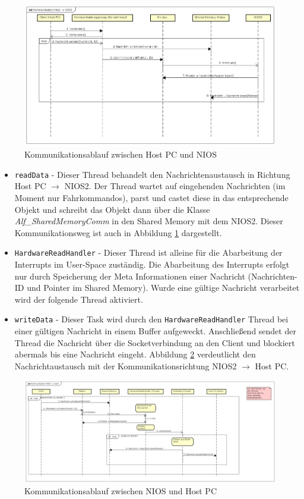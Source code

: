 \begin{figure}
	\includegraphics[width=\textwidth]{Abb/Komm_Host_NIOS.png}
	\caption{Kommunikationsablauf zwischen Host PC und NIOS}
	\label{SW:Komm:HOSTNIOS}
\end{figure}

\begin{itemize}
	\item \lstinline|readData| - Dieser Thread behandelt den Nachrichtenaustausch in Richtung Host PC $\rightarrow$ NIOS2. Der Thread wartet auf eingehenden Nachrichten (im Moment nur Fahrkommandos), parst und castet diese in das entsprechende Objekt und schreibt das Objekt dann über die Klasse \textit{Alf\_SharedMemoryComm} in den Shared Memory mit dem NIOS2. Dieser Kommunikationsweg ist auch in Abbildung \ref{SW:Komm:HOSTNIOS} dargestellt.
	\item \lstinline|HardwareReadHandler| - Dieser Thread ist alleine für die Abarbeitung der Interrupts im User-Space zuständig. Die Abarbeitung des Interrupts erfolgt nur durch Speicherung der Meta Informationen einer Nachricht (Nachrichten-ID und Pointer im Shared Memory). Wurde eine gültige Nachricht verarbeitet wird der folgende Thread aktiviert.
	\item \lstinline|writeData| - Dieser Task wird durch den \lstinline|HardwareReadHandler| Thread bei einer gültigen Nachricht in einem Buffer aufgeweckt. Anschließend sendet der Thread die Nachricht über die Socketverbindung an den Client und blockiert abermals bis eine Nachricht eingeht. Abbildung \ref{SW:Komm:NIOSHOST} verdeutlicht den Nachrichtaustausch mit der Kommunikationsrichtung NIOS2 $\rightarrow$ Host PC.
\end{itemize}

\begin{figure}
	\includegraphics[width=\textwidth]{Abb/Komm_NIOS_Host.png}
	\caption{Kommunikationsablauf zwischen NIOS und Host PC}
	\label{SW:Komm:NIOSHOST}
\end{figure}


